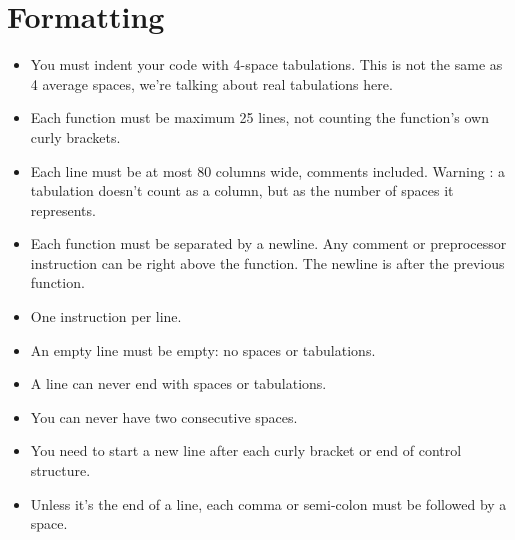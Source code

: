 \documentclass{42-en}
\begin{document}
    \section{Formatting}

            \begin{itemize}

                \item You must indent your code with 4-space
                  tabulations. This is not the same as 4 average
                  spaces, we're talking about real tabulations here.

                \item Each function must be maximum 25 lines, not
                  counting the function's own curly brackets.

                \item Each line must be at most 80 columns wide, comments
                  included. Warning : a tabulation doesn't count
                  as a column, but as the number of spaces it
                  represents.

                \item Each function must be separated by a newline. Any comment or preprocessor instruction
                    can be right above the function. The newline is after the previous function.

                \item One instruction per line.

                \item An empty line must be empty: no spaces or tabulations.

                \item A line can never end with spaces or tabulations.

                \item You can never have two consecutive spaces.

                \item You need to start a new line after each curly bracket
                  or end of control structure.

                \item Unless it's the end of a line, each comma or semi-colon
                  must be followed by a space.


\end{itemize}
\end{document}
